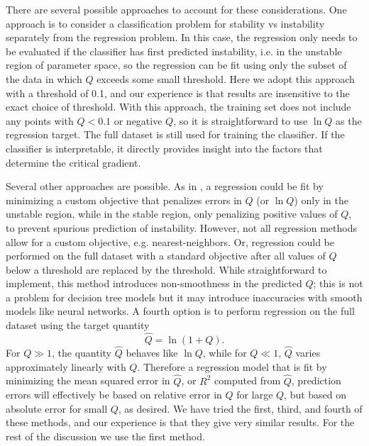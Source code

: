 \documentclass{jpp}
\begin{document}
There are several possible approaches to account for these considerations.
One approach is to consider a classification problem for stability vs instability separately from the regression problem.
In this case, the regression only needs to be evaluated if the classifier has first predicted instability, i.e. in the unstable region of parameter space, so the regression can be fit using only the subset of the data in which $Q$ exceeds some small threshold.
Here we adopt this approach with a threshold of 0.1, and our experience is that results are insensitive to the exact choice of threshold.
With this approach, the training set does not include any points with $Q < 0.1$ or negative $Q$, so it is straightforward to use $\ln Q$ as the regression target.
The full dataset is still used for training the classifier.
If the classifier is interpretable, it directly provides insight into the factors that determine the critical gradient.

Several other approaches are possible.
As in \cite{van2020fast}, a regression could be fit by minimizing a custom objective that penalizes errors in $Q$ (or $\ln Q$) only in the unstable region, while in the stable region, only penalizing positive values of $Q$, to prevent spurious prediction of instability.
However, not all regression methods allow for a custom objective, e.g. nearest-neighbors.
Or, regression could be performed on the full dataset with a standard objective after all values of $Q$ below a threshold are replaced by the threshold.
While straightforward to implement, this method introduces non-smoothness in the predicted $Q$; this is not a problem for decision tree models but it may introduce inaccuracies with smooth models like neural networks.
A fourth option is to perform regression on the full dataset using the target quantity
\begin{equation}
\hat{Q} = \ln(1 + Q).
\label{eq:ln_1_plus_Q}
\end{equation}
For $Q \gg 1$, the quantity $\hat{Q}$ behaves like $\ln Q$, while for $Q \ll 1$, $\hat{Q}$ varies approximately linearly with $Q$.
Therefore a regression model that is fit by minimizing the mean squared error in $\hat{Q}$, or $R^2$ computed from $\hat{Q}$, prediction errors will effectively be based on relative error in $Q$ for large $Q$, but based on absolute error for small $Q$, as desired.
We have tried the first, third, and fourth of these methods, and our experience is that they give very similar results.
For the rest of the discussion we use the first method.
\end{document}

